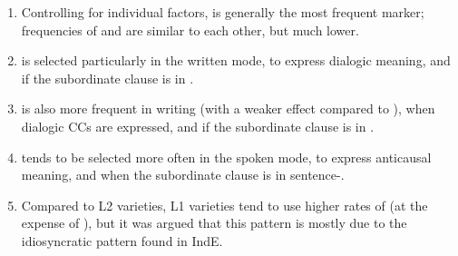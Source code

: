 \begin{enumerate}
  \item Controlling for individual factors,  is generally the most frequent marker; frequencies of  and  are similar to each other, but much lower.
  \item {} is selected particularly in the written mode, to express dialogic meaning, and if the subordinate clause is in .
  \item {} is also more frequent in writing (with a weaker effect compared to ), when dialogic CCs are expressed, and if the subordinate clause is in .
  \item {} tends to be selected more often in the spoken mode, to express anticausal meaning, and when the subordinate clause is in sentence-.
  \item Compared to L2 varieties, L1 varieties tend to use higher rates of  (at the expense of ), but it was argued that this pattern is mostly due to the idiosyncratic pattern found in IndE.
\end{enumerate}


